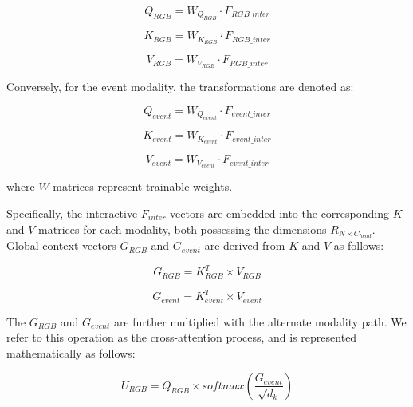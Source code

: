 \documentclass[lettersize,journal]{IEEEtran}
\begin{document}
\begin{equation}
    Q_{RGB} = W_{Q_{RGB}} \cdot F_{RGB\_inter}
\end{equation}

\begin{equation}
    K_{RGB} = W_{K_{RGB}} \cdot F_{RGB\_inter}
\end{equation}

\begin{equation}
    V_{RGB} = W_{V_{RGB}} \cdot F_{RGB\_inter}
\end{equation}


Conversely, for the event modality, the transformations are denoted as:

\begin{equation}
    Q_{event} = W_{Q_{event}} \cdot F_{event\_inter}
\end{equation}

\begin{equation}
    K_{event} = W_{K_{event}} \cdot F_{event\_inter}
\end{equation}

\begin{equation}
    V_{event} = W_{V_{event}} \cdot F_{event\_inter}
\end{equation}


where $W$ matrices represent trainable weights.

Specifically, the interactive $F_{inter}$ vectors are embedded into the corresponding $K$ and $V$ matrices for each modality, both possessing the dimensions $R_{N \times C_{head}}$. Global context vectors $G_{RGB}$ and $G_{event}$ are derived from $K$ and $V$ as follows: 

\begin{equation}
    G_{RGB} = K_{RGB}^{T} \times V_{RGB}
\end{equation}

\begin{equation}
    G_{event} = K_{event}^{T} \times V_{event}
\end{equation}




The $G_{RGB}$ and $G_{event}$ are further multiplied with the alternate modality path.  We refer to this operation as the cross-attention process, and is represented mathematically as follows:





\begin{equation}
    U_{RGB} = Q_{RGB} \times softmax\left(\frac{G_{event}}{\sqrt{d_k}}\right)
\end{equation}
\end{document}

